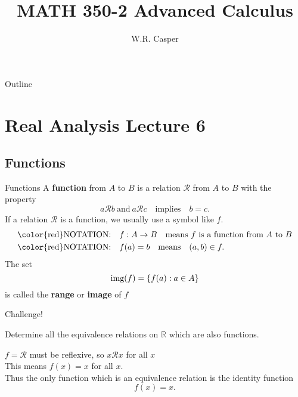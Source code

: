 \documentclass{beamer}
\title{MATH 350-2 Advanced Calculus}
\subtitle
{} %
\author[W.R. Casper] %
{W.R. Casper}
\institute[California State University Fullerton] %
{
  Department of Mathematics\\
  California State University Fullerton}
\begin{document}
\begin{frame}
  \titlepage
\end{frame}

\begin{frame}{Outline}
  \tableofcontents
\end{frame}



\section{Real Analysis Lecture 6}

\subsection{Functions}

\begin{frame}{Functions}
A \textbf{function} from $A$ to $B$ is a relation $\mathcal R$ from $A$ to $B$ with the property
\pause
$$a\mathcal Rb\ \text{and}\ a\mathcal Rc\quad\text{implies}\quad b=c.$$
\pause
If a relation $\mathcal R$ is a function, we usually use a symbol like $f$.\\
\pause
\begin{align*}
\text{\color{red}NOTATION:}&\quad f: A\rightarrow B\quad\text{means $f$ is a function from $A$ to $B$}\\
\text{\color{red}NOTATION:}&\quad f(a) = b\quad\text{means}\quad (a,b)\in f.
\end{align*}
\pause
The set $$\textnormal{img}(f) = \{f(a): a\in A\}$$ is called the \textbf{range} or \textbf{image} of $f$
\end{frame}

\begin{frame}{Challenge!}
\begin{prob}
Determine all the equivalence relations on $\mathbb{R}$ which are also functions.
\end{prob}
\pause
\begin{soln}
$f=\mathcal R$ must be reflexive, so $x\mathcal Rx$ for all $x$\\
\pause
This means $f(x) = x$ for all $x$.\\
\pause
Thus the only function which is an equivalence relation is the identity function
$$f(x) = x.$$
\end{soln}
\end{frame}
\end{document}
